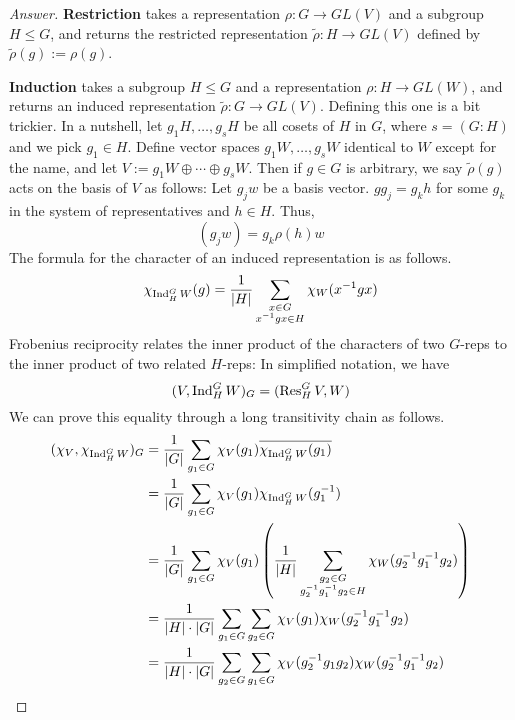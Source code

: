 \documentclass[../notes.tex]{subfiles}
\begin{document}
\begin{itemize}
\begin{proof}[Answer]
        \textbf{Restriction} takes a representation $\rho:G\to GL(V)$ and a subgroup $H\leq G$, and returns the restricted representation $\tilde{\rho}:H\to GL(V)$ defined by $\tilde{\rho}(g):=\rho(g)$.\par
        \textbf{Induction} takes a subgroup $H\leq G$ and a representation $\rho:H\to GL(W)$, and returns an induced representation $\tilde{\rho}:G\to GL(V)$. Defining this one is a bit trickier. In a nutshell, let $g_1H,\dots,g_sH$ be all cosets of $H$ in $G$, where $s=(G:H)$ and we pick $g_1\in H$. Define vector spaces $g_1W,\dots,g_sW$ identical to $W$ except for the name, and let $V:=g_1W\oplus\cdots\oplus g_sW$. Then if $g\in G$ is arbitrary, we say $\tilde{\rho}(g)$ acts on the basis of $V$ as follows: Let $g_jw$ be a basis vector. $gg_j=g_kh$ for some $g_k$ in the system of representatives and $h\in H$. Thus,
        \begin{equation*}
            [\tilde{\rho}(g)](g_jw) = g_k\rho(h)w
        \end{equation*}
        The formula for the character of an induced representation is as follows.
        \begin{equation*}
            \chi_{\operatorname{Ind}_H^GW}(g) = \frac{1}{|H|}\sum_{\substack{x\in G\\x^{-1}gx\in H}}\chi_W(x^{-1}gx)
        \end{equation*}
        Frobenius reciprocity relates the inner product of the characters of two $G$-reps to the inner product of two related $H$-reps: In simplified notation, we have
        \begin{equation*}
            (V,\operatorname{Ind}_H^GW)_G = (\operatorname{Res}_H^GV,W)
        \end{equation*}
        We can prove this equality through a long transitivity chain as follows.
        \begin{align*}
            (\chi_V,\chi_{\ind_H^GW})_G &= \frac{1}{|G|}\sum_{g_1\in G}\chi_V(g_1)\overline{\chi_{\ind_H^GW}(g_1)}\\
            &= \frac{1}{|G|}\sum_{g_1\in G}\chi_V(g_1)\chi_{\ind_H^GW}(g_1^{-1})\\
            &= \frac{1}{|G|}\sum_{g_1\in G}\chi_V(g_1)\left( \frac{1}{|H|}\sum_{\substack{g_2\in G\\g_2^{-1}g_1^{-1}g_2\in H}}\chi_W(g_2^{-1}g_1^{-1}g_2) \right)\\
            &= \frac{1}{|H|\cdot|G|}\sum_{g_1\in G}\sum_{g_2\in G}\chi_V(g_1)\chi_W(g_2^{-1}g_1^{-1}g_2)\\
            &= \frac{1}{|H|\cdot|G|}\sum_{g_2\in G}\sum_{g_1\in G}\chi_V(g_2^{-1}g_1g_2)\chi_W(g_2^{-1}g_1^{-1}g_2)\\

\end{align*}
\end{proof}
\end{itemize}
\end{document}
